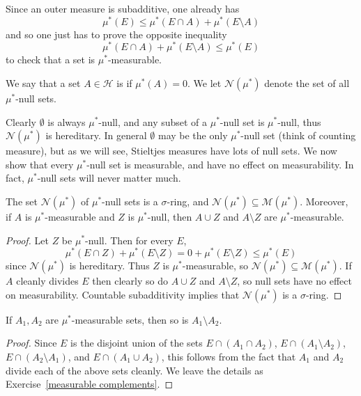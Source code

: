 \begin{subsec}
Since an outer measure is subadditive, one already has
\[\mu^{*}(E) \leq \mu^{*}(E \cap A) + \mu^{*}(E \setminus A)\]
and so one just has to prove the opposite inequality
\begin{equation}\label{Caratheodory inequality}
\mu^{*}(E \cap A) + \mu^{*}(E \setminus A) \leq \mu^{*}(E)
\end{equation}
to check that a set is $\mu^{*}$-measurable.
\end{subsec}

\begin{definition}
We say that a set $A \in \mathcal H$ is  if $\mu^{*}(A) = 0$.
We let $\mathcal N(\mu^{*})$ denote the set of all $\mu^{*}$-null sets.
\end{definition}

\begin{subsec}
Clearly $\emptyset$ is always $\mu^{*}$-null, and any subset of a $\mu^{*}$-null set is $\mu^{*}$-null, thus $\mathcal N(\mu^{*})$ is hereditary.
In general $\emptyset$ may be the only $\mu^{*}$-null set (think of counting measure), but as we will see, Stieltjes measures have lots of null sets.
We now show that every $\mu^{*}$-null set is measurable, and have no effect on measurability.
In fact, $\mu^{*}$-null sets will never matter much.
\end{subsec}

\begin{lemma}
The set $\mathcal N(\mu^{*})$ of $\mu^{*}$-null sets is a $\sigma$-ring, and $\mathcal N(\mu^{*}) \subseteq \mathcal M(\mu^{*})$.
Moreover, if $A$ is $\mu^{*}$-measurable and $Z$ is $\mu^{*}$-null, then $A \cup Z$ and $A \setminus Z$ are $\mu^{*}$-measurable.
\end{lemma}
\begin{proof}
Let $Z$ be $\mu^{*}$-null. Then for every $E$,
\[\mu^{*}(E \cap Z) + \mu^{*}(E \setminus Z) = 0 + \mu^{*}(E \setminus Z) \leq \mu^{*}(E)\]
since $\mathcal N(\mu^{*})$ is hereditary.
Thus $Z$ is $\mu^{*}$-measurable, so $\mathcal N(\mu^{*}) \subseteq \mathcal M(\mu^{*})$.
If $A$ cleanly divides $E$ then clearly so do $A \cup Z$ and $A \setminus Z$, so null sets have no effect on measurability.
Countable subadditivity implies that $\mathcal N(\mu^{*})$ is a $\sigma$-ring.
\end{proof}

\begin{lemma}\label{measurable complements lemma}
If $A_{1}, A_{2}$ are $\mu^{*}$-measurable sets, then so is $A_{1} \setminus A_{2}$.
\end{lemma}
\begin{proof}
Since $E$ is the disjoint union of the sets $E \cap (A_{1} \cap A_{2})$, $E \cap (A_{1} \setminus A_{2})$, $E \cap (A_{2} \setminus A_{1})$, and $E \cap (A_{1} \cup A_{2})$, this follows from the fact that $A_{1}$ and $A_{2}$ divide each of the above sets cleanly.
We leave the details as Exercise~\ref{measurable complements}.
\end{proof}

